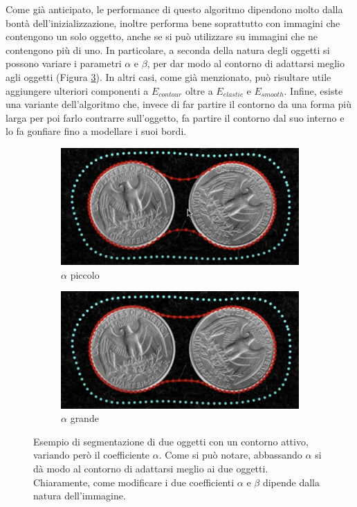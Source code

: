 Come già anticipato, le performance di questo algoritmo dipendono molto dalla bontà dell'inizializzazione, inoltre performa bene soprattutto con immagini che contengono un solo oggetto, anche se si può utilizzare su immagini che ne contengono più di uno. In particolare, a seconda della natura degli oggetti si possono variare i parametri $\alpha$ e $\beta$, per dar modo al contorno di adattarsi meglio  agli oggetti (Figura \ref{fig:two-coin-segm}). In altri casi, come già menzionato, può risultare utile aggiungere ulteriori componenti a $E_{contour}$ oltre a $E_{elastic}$ e $E_{smooth}$.
Infine, esiste una variante dell'algoritmo che, invece di far partire il contorno da una forma più larga per poi farlo contrarre sull'oggetto, fa partire il contorno dal suo interno e lo fa gonfiare fino a modellare i suoi bordi.

\begin{figure}
     \centering
     \begin{subfigure}[b]{0.6\textwidth}
         \centering
         \includegraphics[width=\textwidth]{img/activ_cont4.png}
         \caption{$\alpha$ piccolo}
         \label{fig:y equals x}
     \end{subfigure}
     \hfill
     \begin{subfigure}[b]{0.6\textwidth}
         \centering
         \includegraphics[width=\textwidth]{img/activ_cont5.png}
         \caption{$\alpha$ grande}
         \label{fig:three sin x}
     \end{subfigure}
        \caption{Esempio di segmentazione di due oggetti con un contorno attivo, variando però il coefficiente $\alpha$. Come si può notare, abbassando $\alpha$ si dà modo al contorno di adattarsi meglio ai due oggetti. Chiaramente, come modificare i due coefficienti $\alpha$ e $\beta$ dipende dalla natura dell'immagine.}
        \label{fig:two-coin-segm}
\end{figure}
